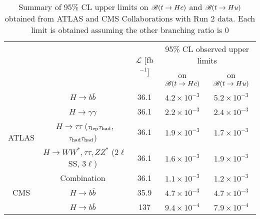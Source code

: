 \begin{table}[t!]
\caption{\small{Summary of 95\% CL upper limits on $\mathscr{B}(t \to Hc)$ and $\mathscr{B}(t \to Hu)$ obtained from ATLAS and CMS Collaborations with Run 2 data. Each limit is obtained assuming the other branching ratio is 0}}
\begin{center}
\small 
\begin{tabular}{ccccc}
\toprule\toprule
& &\multirow{2}{*}{$\mathcal{L}$ [fb$^{-1}$]} & \multicolumn{2}{c}{95\% CL observed upper limits}  \\
& & 										    & \multicolumn{1}{c}{on $\mathscr{B}(t \to Hc)$}            & \multicolumn{1}{c}{on $\mathscr{B}(t \to Hu)$} \\
\midrule
\multirow{5}{*}{ATLAS}
& $H \to b\bar{b}$~\cite{fcnc36}                                          & 36.1         & $4.2 \times 10^{-3}$ & $5.2 \times 10^{-3}$ \\
& $H \to \gamma\gamma$~\cite{Aaboud:2017mfd}                              & 36.1         & $2.2 \times 10^{-3}$  & $2.4 \times 10^{-3}$  \\
& $H \to \tau\tau$ ($\tau_{\mathrm{lep}} \tau_{\mathrm{had}}$, $\tau_{\mathrm{had}} \tau_{\mathrm{had}}$)~\cite{fcnc36}                   & 36.1         & $1.9 \times 10^{-3}$  & $1.7 \times 10^{-3}$  \\ 
& $H \to WW^*, \tau\tau, ZZ^*$ ($2\ell$SS, $3\ell$)~\cite{Aaboud:2018pob} & 36.1         & $1.6 \times 10^{-3}$  & $1.9 \times 10^{-3}$\\ 
& Combination~\cite{fcnc36}                                               & 36.1         & $1.1 \times 10^{-3}$  & $1.2 \times 10^{-3}$  \\\midrule
\multirow{1}{*}{CMS} 
& $H \to b\bar{b}$~\cite{Sirunyan:2017uae}                                & 35.9         & $4.7 \times 10^{-3}$  & $4.7 \times 10^{-3}$  \\
& $H \to b\bar{b}$~\cite{CMS:2021gfa}                                     & 137          & $9.4 \times 10^{-4}$  & $7.9 \times 10^{-4}$  \\
% 
\bottomrule\bottomrule
\end{tabular}
\label{tab:limits_summary_ref}
\end{center}
\end{table}




